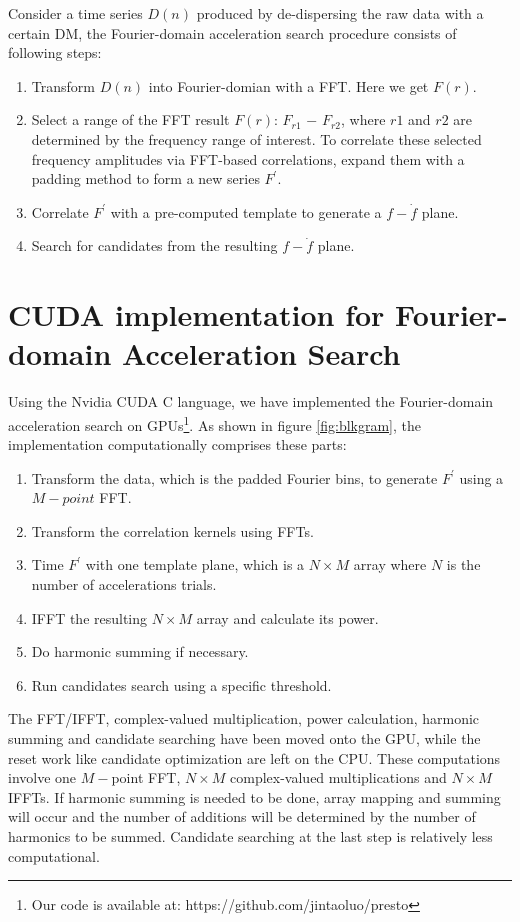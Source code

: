 \documentclass[preprint2]{aastex}
\begin{document}
Consider a time series $D(n)$ produced by de-dispersing the raw data with a 
certain DM, the Fourier-domain acceleration search procedure consists of following steps:
\begin{enumerate}
  \item Transform $D(n)$ into Fourier-domian with a FFT. Here we get $F(r)$.
  \item Select a range of the FFT result $F(r)$: $F_{r1}$ $-$ $F_{r2}$, 
where $r1$ and $r2$ are determined by the frequency range of interest. To correlate 
these selected frequency amplitudes via FFT-based correlations, expand them with 
a padding method to form a new series $F^{'}$.
  \item Correlate $F^{'}$ with a pre-computed template to generate a $f-\dot{f}$ 
plane.
  \item Search for candidates from the resulting $f-\dot{f}$ plane.
\end{enumerate}

\section{CUDA implementation for Fourier-domain Acceleration Search}

Using the Nvidia CUDA C language, we have implemented the Fourier-domain 
acceleration search on GPUs\footnote{Our code is available at: https://github.com/jintaoluo/presto}. As shown in figure \ref{fig:blkgram}, the implementation
computationally comprises these parts:
\begin{enumerate}
  \item Transform the data, which is the padded Fourier bins, to generate $F^{'}$ using a $M-point$ 
FFT.
	\item Transform the correlation kernels using FFTs.
  \item Time $F^{'}$ with one template plane, which is a $N\times$$M$ array 
where $N$ is the number of accelerations trials.
  \item IFFT the resulting $N\times$$M$ array and calculate its power.
  \item Do harmonic summing if necessary.
  \item Run candidates search using a specific threshold.
\end{enumerate}
The FFT/IFFT, complex-valued multiplication, power calculation, harmonic summing and 
candidate searching have been moved onto the GPU, while the reset work like candidate
 optimization are left on the CPU.
These computations involve one $M-$point FFT, $N\times$$M$ complex-valued 
multiplications and $N\times$$M$ IFFTs. If harmonic summing is needed to be done, 
array mapping and summing will occur and the number of additions will be determined by 
the number of harmonics to be summed. Candidate searching at the last step is 
relatively less computational.
\end{document}
